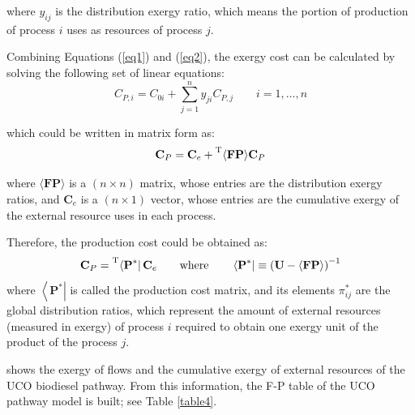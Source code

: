 \documentclass[sustainability,article,accept,moreauthors,pdftex,12pt,a4paper]{mdpi}
\newcommand{\mopcr}[1]{\ensuremath{\left\langle {\textbf{#1}^\ast } \right|}}
\newcommand{\tmopcr}[1]{\ensuremath{\prescript{\mathrm{T}}{}{\left\langle {\textbf{#1}^\ast } \right|}}}
\newcommand{\mbr}[1]{\ensuremath{\langle \textbf{#1} \rangle}}
\newcommand{\tmbr}[1]{\ensuremath{\prescript{\mathrm{T}}{}{\langle \textbf{#1} \rangle}}}
\newcommand{\vm}[1]{\ensuremath{\mathbf{#1}}}
\begin{document}
\noindent where $y_{ij}$ is the distribution exergy ratio, which means the portion of production of process $i$ uses as resources of process $j$.

Combining Equations (\ref{eq1}) and (\ref{eq2}), the exergy cost can be calculated by solving the following set of linear equations:
\begin{equation}
C_{P,i}=C_{0i}+\sum_{j=1}^{n}{y_{ji}C_{P,j}} \qquad i=1,\ldots, n
\end{equation}

\noindent which could be written in matrix form as:
\begin{equation}
\vm{C}_P = \vm{C}_e + \tmbr{FP} \vm{C}_P
\end{equation}

\noindent where \mbr{FP} is a $(n \times n)$ matrix, whose entries are the distribution exergy ratios, and $\vm{C}_e$ is a $(n \times 1)$ vector, whose entries are the cumulative exergy of the external resource uses in each process.

Therefore, the production cost could be obtained as:
\begin{equation}
 \vm{C}_P =\tmopcr{P} \, \vm{C}_e \qquad \text{where} \qquad \mopcr{P} \equiv \left(\vm{U}-\mbr{FP}\right)^{-1}
 \label{eq4}
\end{equation}
where \mopcr{P} is called the production cost matrix, and its elements $\pi_{ij}^{\ast}$ are the global distribution ratios, which represent the amount of external resources (measured in exergy) of process $i$ required to obtain one exergy unit of the product of the process $j$.

 shows the exergy of flows and the cumulative exergy of external resources of the UCO biodiesel pathway. From this information, the F-P table of the UCO pathway model is built; see Table \ref{table4}.
\end{document}

